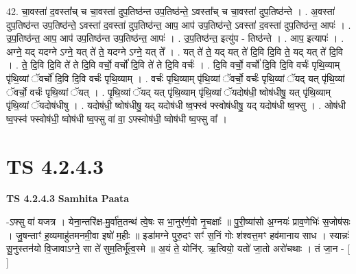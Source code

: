 \documentclass[17pt]{extarticle}
\begin{document}
42. चा॒वस्ता॑ द॒वस्ता᳚च् च चा॒वस्ता॑ दुप॒तिष्ठ॑न्त उप॒तिष्ठ॑न्ते॒ ऽवस्ता᳚च् च चा॒वस्ता॑ दुप॒तिष्ठ॑न्ते । . अ॒वस्ता॑ दुप॒तिष्ठ॑न्त उप॒तिष्ठ॑न्ते॒ ऽवस्ता॑ द॒वस्ता॑ दुप॒तिष्ठ॑न्त॒ आप॒ आप॑ उप॒तिष्ठ॑न्ते॒ ऽवस्ता॑ द॒वस्ता॑ दुप॒तिष्ठ॑न्त॒ आपः॑ । . उ॒प॒तिष्ठ॑न्त॒ आप॒ आप॑ उप॒तिष्ठ॑न्त उप॒तिष्ठ॑न्त॒ आपः॑ । . उ॒प॒तिष्ठ॑न्त॒ इत्यु॑प - तिष्ठ॑न्ते । . आप॒ इत्यापः॑ । . अग्ने॒ यद् यदग्ने ऽग्ने॒ यत् ते॑ ते॒ यदग्ने ऽग्ने॒ यत् ते᳚ । . यत् ते॑ ते॒ यद् यत् ते॑ दि॒वि दि॒वि ते॒ यद् यत् ते॑ दि॒वि । . ते॒ दि॒वि दि॒वि ते॑ ते दि॒वि वर्चो॒ वर्चो॑ दि॒वि ते॑ ते दि॒वि वर्चः॑ । . दि॒वि वर्चो॒ वर्चो॑ दि॒वि दि॒वि वर्चः॑ पृथि॒व्याम् पृ॑थि॒व्यां ॅवर्चो॑ दि॒वि दि॒वि वर्चः॑ पृथि॒व्याम् । . वर्चः॑ पृथि॒व्याम् पृ॑थि॒व्यां ॅवर्चो॒ वर्चः॑ पृथि॒व्यां ॅयद् यत् पृ॑थि॒व्यां ॅवर्चो॒ वर्चः॑ पृथि॒व्यां ॅयत् । . पृ॒थि॒व्यां ॅयद् यत् पृ॑थि॒व्याम् पृ॑थि॒व्यां ॅयदोष॑धी॒ ष्वोष॑धीषु॒ यत् पृ॑थि॒व्याम् पृ॑थि॒व्यां ॅयदोष॑धीषु । . यदोष॑धी॒ ष्वोष॑धीषु॒ यद् यदोष॑धी ष्व॒फ्स्व॑ फ्स्वोष॑धीषु॒ यद् यदोष॑धी ष्व॒फ्सु । . ओष॑धी ष्व॒फ्स्व॑ फ्स्वोष॑धी॒ ष्वोष॑धी ष्व॒फ्सु वा॑ वा॒ ऽफ्स्वोष॑धी॒ ष्वोष॑धी ष्व॒फ्सु वा᳚ । \newline
\pagebreak
{}

\section{ TS 4.2.4.3 }

\textbf{TS 4.2.4.3 } \newline
\textbf{Samhita Paata} \newline

-ऽफ्सु वा॑ यजत्र । येना॒न्तरि॑क्ष-मु॒र्वा॑त॒तन्थ॑ त्वे॒षः स भा॒नुर॑र्ण॒वो नृ॒चक्षाः᳚ ॥ पु॒री॒ष्या॑सो अ॒ग्नयः॑ प्राव॒णेभिः॑ स॒जोष॑सः । जु॒षन्ताꣳ॑ ह॒व्यमाहु॑तमनमी॒वा इषो॑ म॒हीः ॥ इडा॑मग्ने पुरु॒दꣳ सꣳ॑ स॒निं गोः श॑श्वत्त॒मꣳ हव॑मानाय साध । स्यान्नः॑ सू॒नुस्तन॑यो वि॒जावाऽग्ने॒ सा ते॑ सुम॒तिर्भू᳚त्व॒स्मे ॥ अ॒यं ते॒ योनि॑र्. ऋ॒त्वियो॒ यतो॑ जा॒तो अरो॑चथाः । तं जा॒न - [  ] \newline
\end{document}
